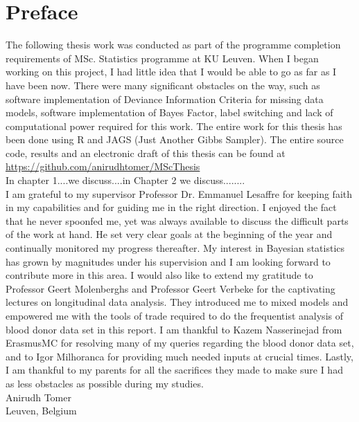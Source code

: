 
\chapter{Preface}
\label{ch : preface}

The following thesis work was conducted as part of the programme completion requirements of MSc. Statistics programme at KU Leuven. When I began working on this project, I had little idea that I would be able to go as far as I have been now. There were many significant obstacles on the way, such as software implementation of Deviance Information Criteria for missing data models, software implementation of Bayes Factor, label switching and lack of computational power required for this work. The entire work for this thesis has been done using R and JAGS (Just Another Gibbs Sampler). The entire source code, results and an electronic draft of this thesis can be found at\\
\url{https://github.com/anirudhtomer/MScThesis}\\

In chapter 1....we discuss....in Chapter 2 we discuss........\\

I am grateful to my supervisor Professor Dr. Emmanuel Lesaffre for keeping faith in my capabilities and for guiding me in the right direction. I enjoyed the fact that he never spoonfed me, yet was always available to discuss the difficult parts of the work at hand. He set very clear goals at the beginning of the year and continually monitored my progress thereafter. My interest in Bayesian statistics has grown by magnitudes under his supervision and I am looking forward to contribute more in this area. I would also like to extend my gratitude to Professor Geert Molenberghs and Professor Geert Verbeke for the captivating lectures on longitudinal data analysis. They introduced me to mixed models and empowered me with the tools of trade required to do the frequentist analysis of blood donor data set in this report. I am thankful to Kazem Nasserinejad from ErasmusMC for resolving many of my queries regarding the blood donor data set, and to Igor Milhoranca for providing much needed inputs at crucial times. Lastly, I am thankful to my parents for all the sacrifices they made to make sure I had as less obstacles as possible during my studies.\\

Anirudh Tomer\\
Leuven, Belgium